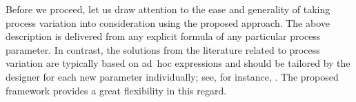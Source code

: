 Before we proceed, let us draw attention to the ease and generality of taking
process variation into consideration using the proposed approach. The above
description is delivered from any explicit formula of any particular process
parameter. In contrast, the solutions from the literature related to process
variation are typically based on ad~hoc expressions and should be tailored by
the designer for each new parameter individually; see, for instance,
\cite{ghanta2006, bhardwaj2008, huang2009a}. The proposed framework provides a
great flexibility in this regard.
